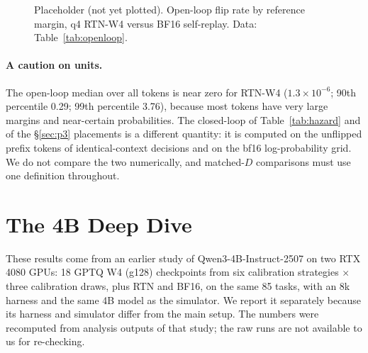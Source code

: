 \begin{figure}[h]
\centering
{}
\caption{Placeholder (not yet plotted). Open-loop flip rate by reference margin, q4 RTN-W4 versus BF16 self-replay. Data: Table~\ref{tab:openloop}.}
\label{fig:openloop}
\end{figure}

\paragraph{A caution on units.} The open-loop median \absd{} over all tokens is near zero for RTN-W4 ($1.3 \times 10^{-6}$; 90th percentile 0.29; 99th percentile 3.76), because most tokens have very large margins and near-certain probabilities. The closed-loop \absd{} of Table~\ref{tab:hazard} and of the \S\ref{sec:p3} placements is a different quantity: it is computed on the unflipped prefix tokens of identical-context decisions and on the bf16 log-probability grid. We do not compare the two numerically, and matched-$D$ comparisons must use one definition throughout. 

\section{The 4B Deep Dive}
\label{app:deepdive}

These results come from an earlier study of Qwen3-4B-Instruct-2507 on two RTX 4080 GPUs: 18 GPTQ W4 (g128) checkpoints from six calibration strategies $\times$ three calibration draws, plus RTN and BF16, on the same 85 tasks, with an 8k harness and the same 4B model as the simulator. We report it separately because its harness and simulator differ from the main setup. The numbers were recomputed from analysis outputs of that study; the raw runs are not available to us for re-checking.

